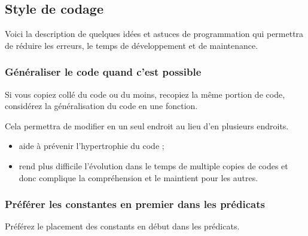 \subsection{Style de codage}
Voici la description de quelques id\'ees et astuces de programmation qui permettra de r\'eduire les erreurs, le temps de d\'eveloppement et de maintenance.

\subsubsection{G\'en\'eraliser le code quand c'est possible}

Si vous copiez coll\'e du code ou du moins, recopiez la m\^eme portion de code, consid\'erez la g\'en\'eralisation du code en une fonction.

Cela permettra de modifier en un seul endroit au lieu d'en plusieurs endroits.

\begin{itemize}
\item aide \`a pr\'evenir l'hypertrophie du code ;
\item rend plus difficile l'\'evolution dans le temps de multiple copies de codes et donc complique la compr\'ehension et le maintient pour les autres.
\end{itemize}

\subsubsection{Pr\'ef\'erer les constantes en premier dans les pr\'edicats}
Pr\'ef\'erez le placement des constants en d\'ebut dans les pr\'edicats.


